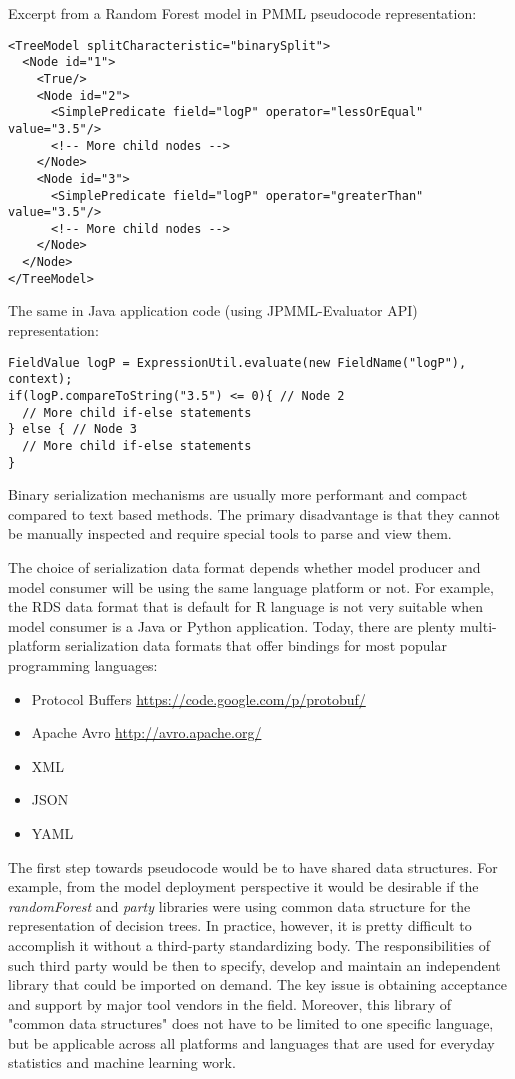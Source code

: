 \documentclass[12pt,letterpaper]{article}
\begin{document}
Excerpt from a Random Forest model in PMML pseudocode representation:
\begin{verbatim}
<TreeModel splitCharacteristic="binarySplit">
  <Node id="1">
    <True/>
    <Node id="2">
      <SimplePredicate field="logP" operator="lessOrEqual" value="3.5"/>
      <!-- More child nodes -->
    </Node>
    <Node id="3">
      <SimplePredicate field="logP" operator="greaterThan" value="3.5"/>
      <!-- More child nodes -->
    </Node>
  </Node>
</TreeModel>
\end{verbatim}

The same in Java application code (using JPMML-Evaluator API) representation:
\begin{verbatim}
FieldValue logP = ExpressionUtil.evaluate(new FieldName("logP"), context);
if(logP.compareToString("3.5") <= 0){ // Node 2
  // More child if-else statements
} else { // Node 3
  // More child if-else statements
}
\end{verbatim}

Binary serialization mechanisms are usually more performant and 
compact compared to text based methods. The primary disadvantage is
that they cannot be manually inspected and require special tools to
parse and view them.

The choice of serialization data format depends whether model producer 
and model consumer will be using the same language platform or not. For
example, the RDS data format that is default for R language is not very
suitable when model consumer is a Java or Python application. Today,
there are plenty multi-platform serialization data formats that offer
bindings for most popular programming languages:
\begin{itemize}
  \item Protocol Buffers \url{https://code.google.com/p/protobuf/}
  \item Apache Avro \url{http://avro.apache.org/}
  \item XML
  \item JSON
  \item YAML
\end{itemize}

The first step towards pseudocode would be to have shared data structures.
For example, from the model deployment perspective it would be desirable
if the \textit{randomForest} and \textit{party} libraries were using common
data structure for the representation of decision trees. In practice,
however, it is pretty difficult to accomplish it without a third-party 
standardizing body. The responsibilities of such third party would be 
then to specify, develop and maintain an independent library that could
be imported on demand. The key issue is obtaining acceptance and support
by major tool vendors in the field. Moreover, this library of "common 
data structures" does not have to be limited to one specific language, but
be applicable across all platforms and languages that are used for
everyday statistics and machine learning work.
\end{document}
